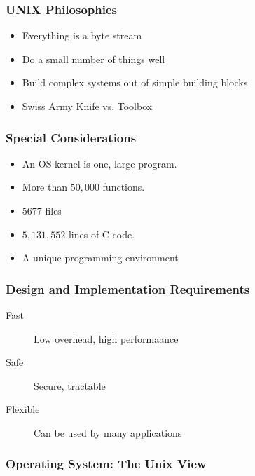 \documentclass[pdftex]{beamer} %
\begin{document}
\begin{frame}
  \frametitle{UNIX Philosophies}
  \begin{itemize}
  \item Everything is a byte stream
  \item Do a small number of things well
  \item Build complex systems out of simple building blocks
  \item Swiss Army Knife vs. Toolbox
  \end{itemize}
\end{frame}

\begin{frame}
  \frametitle{Special Considerations}
  \begin{itemize}
  \item An OS kernel is one, large program.
  \item More than $50,000$ functions.
  \item $5677$ files    
  \item $5,131,552$ lines of C code.
  \item A unique programming environment
  \end{itemize}
\end{frame}

\begin{frame}
  \frametitle{Design and Implementation Requirements}
  \begin{description}
  \item[Fast] Low overhead, high performaance
  \item[Safe] Secure, tractable
  \item[Flexible] Can be used by many applications
  \end{description}
\end{frame}

\begin{frame}
  \frametitle{Operating System: The Unix View}
  
\end{frame}
\end{document}
